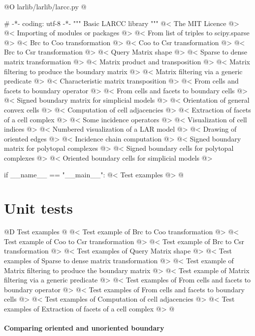 \documentclass[11pt,oneside]{article}	%
\begin{document}
@O larlib/larlib/larcc.py
@{# -*- coding: utf-8 -*-
""" Basic LARCC library """
@< The MIT Licence @>
@< Importing of modules or packages @>
@< From list of triples to scipy.sparse @>
@< Brc to Coo transformation @>
@< Coo to Csr transformation @>
@< Brc to Csr transformation @>
@< Query Matrix shape @>
@< Sparse to dense matrix transformation @>
@< Matrix product and transposition @>
@< Matrix filtering to produce the boundary matrix @>
@< Matrix filtering via a generic predicate @>
@< Characteristic matrix transposition @>
@< From cells and facets to boundary operator @>
@< From cells and facets to boundary cells @>
@< Signed boundary matrix for simplicial models @>
@< Orientation of general convex cells @>
@< Computation of cell adjacencies @>
@< Extraction of facets of a cell complex @>
@< Some incidence operators @>
@< Visualization of cell indices @>
@< Numbered visualization of a LAR model @>
@< Drawing of oriented edges @>
@< Incidence chain computation @>
@< Signed boundary matrix for polytopal complexes @>
@< Signed boundary cells for polytopal complexes @>
@<  Oriented boundary cells for simplicial models @>

if __name__ == "__main__": 
	@< Test examples @>
@}

\section{Unit tests}


@D Test examples
@{
@< Test example of Brc to Coo transformation @>
@< Test example of Coo to Csr transformation @>
@< Test example of Brc to Csr transformation @>
@< Test examples of Query Matrix shape @>
@< Test examples of Sparse to dense matrix transformation @>
@< Test example of Matrix filtering to produce the boundary matrix @>
@< Test example of Matrix filtering via a generic predicate @>
@< Test examples of From cells and facets to boundary operator @>
@< Test examples of From cells and facets to boundary cells @>
@< Test examples of Computation of cell adjacencies @>
@< Test examples of Extraction of facets of a cell complex @>
@}

\paragraph{Comparing oriented and unoriented boundary}
\end{document}
